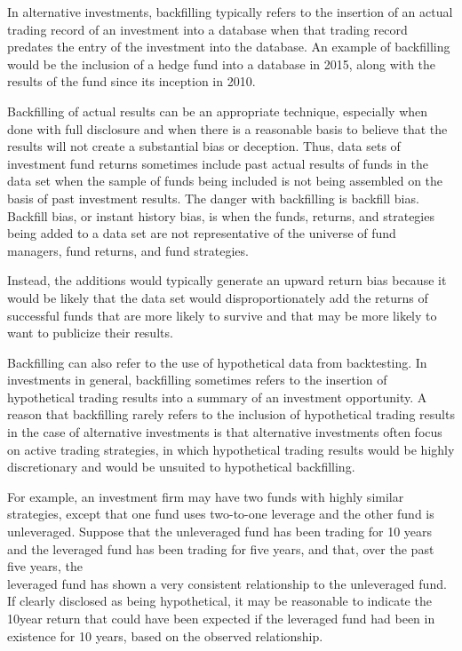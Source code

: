 \documentclass[11pt]{article}
\begin{document}
In alternative investments, backfilling typically refers to the insertion of an actual trading record of an investment into a database when that trading record predates the entry of the investment into the database. An example of backfilling would be the inclusion of a hedge fund into a database in 2015, along with the results of the fund since its inception in 2010.

Backfilling of actual results can be an appropriate technique, especially when done with full disclosure and when there is a reasonable basis to believe that the results will not create a substantial bias or deception. Thus, data sets of investment fund returns sometimes include past actual results of funds in the data set when the sample of funds being included is not being assembled on the basis of past investment results. The danger with backfilling is backfill bias. Backfill bias, or instant history bias, is when the funds, returns, and strategies being added to a data set are not representative of the universe of fund managers, fund returns, and fund strategies.

Instead, the additions would typically generate an upward return bias because it would be likely that the data set would disproportionately add the returns of successful funds that are more likely to survive and that may be more likely to want to publicize their results.

Backfilling can also refer to the use of hypothetical data from backtesting. In investments in general, backfilling sometimes refers to the insertion of hypothetical trading results into a summary of an investment opportunity. A reason that backfilling rarely refers to the inclusion of hypothetical trading results in the case of alternative investments is that alternative investments often focus on active trading strategies, in which hypothetical trading results would be highly discretionary and would be unsuited to hypothetical backfilling.

For example, an investment firm may have two funds with highly similar strategies, except that one fund uses two-to-one leverage and the other fund is unleveraged. Suppose that the unleveraged fund has been trading for 10 years and the leveraged fund has been trading for five years, and that, over the past five years, the\\
leveraged fund has shown a very consistent relationship to the unleveraged fund. If clearly disclosed as being hypothetical, it may be reasonable to indicate the 10year return that could have been expected if the leveraged fund had been in existence for 10 years, based on the observed relationship.
\end{document}
